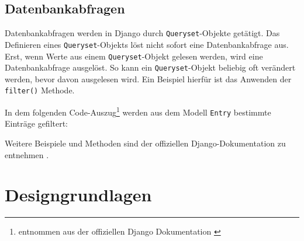 \hypertarget{datenbankabfragen}{%
\subsection{Datenbankabfragen}\label{datenbankabfragen}}

Datenbankabfragen werden in Django durch \texttt{Queryset}-Objekte
getätigt. Das Definieren eines \texttt{Queryset}-Objekts löst nicht
sofort eine Datenbankabfrage aus. Erst, wenn Werte aus einem
\texttt{Queryset}-Objekt gelesen werden, wird eine Datenbankabfrage
ausgelöst. So kann ein \texttt{Queryset}-Objekt beliebig oft verändert
werden, bevor davon ausgelesen wird. Ein Beispiel hierfür ist das
Anwenden der \texttt{filter()} Methode.

In dem folgenden Code-Auszug\footnote{entnommen aus der offiziellen
  Django Dokumentation \cite{django-doku-queries}} werden aus dem Modell
\texttt{Entry} bestimmte Einträge gefiltert:

\begin{Shaded}
\begin{Highlighting}[]
\OperatorTok{=}\OperatorTok{=}\NormalTok{)}

\OperatorTok{=}\OperatorTok{=}

\OperatorTok{=}\OperatorTok{=}\NormalTok{)}

\end{Highlighting}
\end{Shaded}

Weitere Beispiele und Methoden sind der offiziellen Django-Dokumentation
zu entnehmen \cite{django-doku-queries}.

\hypertarget{designgrundlagen}{%
\section{Designgrundlagen}\label{designgrundlagen}}

